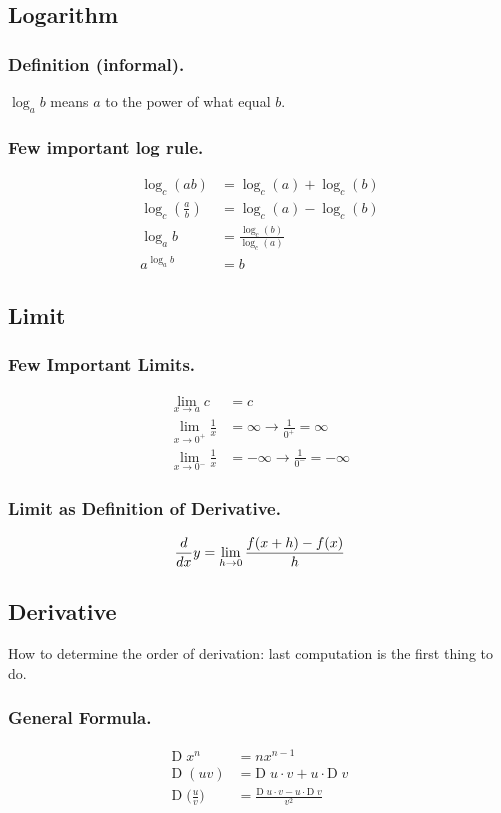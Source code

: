 \documentclass[../main.tex]{subfiles}
\begin{document}
\subsection*{Logarithm}
\subsubsection*{Definition (informal).} $\log_a b$ means $a$ to the power of what equal $b$.

\subsubsection*{Few important log rule.}
\begin{align*}
    \log_c (ab)&=\log_c (a)+\log_c (b)\\
    \log_c (\frac{a}{b})&=\log_c (a)-\log_c (b)\\
    \log_a b&=\frac{\log_c (b)}{\log_c (a)}\\
    a^{\log_a b}&=b
\end{align*}

\subsection*{Limit}
\subsubsection*{Few Important Limits.}
\begin{align*}
    \lim_{x\to a} c&=c\\
    \lim_{x\to 0^+} \frac{1}{x}&=\infty\rightarrow\frac{1}{0^+}=\infty\\
    \lim_{x\to 0^-} \frac{1}{x}&=-\infty\rightarrow\frac{1}{0^-}=-\infty
\end{align*}
\subsubsection*{Limit as Definition of Derivative.}
\begin{align*}
    \frac{d}{dx} y=\lim_{h\to 0}\frac{f(x+h)-f(x)}{h}
\end{align*}

\subsection*{Derivative}
How to determine the order of derivation: last computation is the first thing to do.

\subsubsection*{General Formula.}
\begin{align*}
    \mathrm{D}\; x^n&=nx^{n-1}\\
    \mathrm{D}\; (uv)&=\mathrm{D}\;u\cdot v+u\cdot\mathrm{D}\;v\\
    \mathrm{D}\;\bigg(\frac{u}{v}\bigg)&=\frac{\mathrm{D}\;u\cdot v-u\cdot\mathrm{D}\;v}{v^2}
\end{align*}
\end{document}
